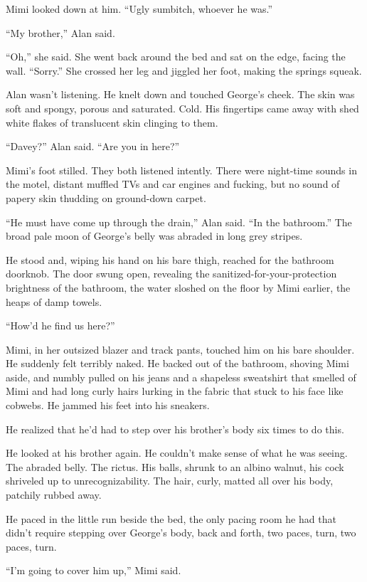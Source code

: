 \documentclass{article}
\begin{document}
Mimi looked down at him.  ``Ugly sumbitch, whoever he was.''

``My brother,'' Alan said.

``Oh,'' she said.  She went back around the bed and sat on the edge,
facing the wall.  ``Sorry.'' She crossed her leg and jiggled her foot,
making the springs squeak.

Alan wasn't listening.  He knelt down and touched George's cheek.  The
skin was soft and spongy, porous and saturated.  Cold.  His fingertips
came away with shed white flakes of translucent skin clinging to them.

``Davey?'' Alan said.  ``Are you in here?''

Mimi's foot stilled.  They both listened intently.  There were
night-time sounds in the motel, distant muffled TVs and car engines
and fucking, but no sound of papery skin thudding on ground-down
carpet.

``He must have come up through the drain,'' Alan said.  ``In the
bathroom.'' The broad pale moon of George's belly was abraded in long
grey stripes.

He stood and, wiping his hand on his bare thigh, reached for the
bathroom doorknob.  The door swung open, revealing the
sanitized-for-your-protection brightness of the bathroom, the water
sloshed on the floor by Mimi earlier, the heaps of damp towels.

``How'd he find us here?''

Mimi, in her outsized blazer and track pants, touched him on his bare
shoulder.  He suddenly felt terribly naked.  He backed out of the
bathroom, shoving Mimi aside, and numbly pulled on his jeans and a
shapeless sweatshirt that smelled of Mimi and had long curly hairs
lurking in the fabric that stuck to his face like cobwebs.  He jammed
his feet into his sneakers.

He realized that he'd had to step over his brother's body six times to
do this.

He looked at his brother again.  He couldn't make sense of what he was
seeing.  The abraded belly.  The rictus.  His balls, shrunk to an
albino walnut, his cock shriveled up to unrecognizability.  The hair,
curly, matted all over his body, patchily rubbed away.

He paced in the little run beside the bed, the only pacing room he had
that didn't require stepping over George's body, back and forth, two
paces, turn, two paces, turn.

``I'm going to cover him up,'' Mimi said.
\end{document}
